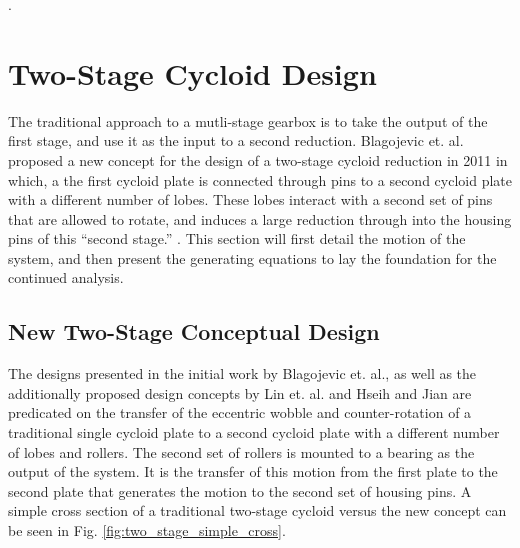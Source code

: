 .

\section{Two-Stage Cycloid Design} \label{ch:dual:initial_equations}

The traditional approach to a mutli-stage gearbox is to take the output of the first stage, and use it as the input to a second reduction. Blagojevic et. al. proposed a new concept for the design of a two-stage cycloid reduction in 2011 in which, a the first cycloid plate is connected through pins to a second cycloid plate with a different number of lobes. These lobes interact with a second set of pins that are allowed to rotate, and induces a large reduction through into the housing pins of this ``second stage.'' \cite{ref:new_two_stage}. This section will first detail the motion of the system, and then present the generating equations to lay the foundation for the continued analysis. 

\subsection{New Two-Stage Conceptual Design} \label{ch:dual:initial_equation:motion}

The designs presented in the initial work by Blagojevic et. al., as well as the additionally proposed design concepts by Lin et. al. \cite{ref:two_stage_tooth_mod} and Hseih and Jian \cite{ref:hsieh_effect_2016} are predicated on the transfer of the eccentric wobble and counter-rotation of a traditional single cycloid plate to a second cycloid plate with a different number of lobes and rollers. The second set of rollers is mounted to a bearing as the output of the system. It is the transfer of this motion from the first plate to the second plate that generates the motion to the second set of housing pins. A simple cross section of a traditional two-stage cycloid versus the new concept can be seen in Fig. \ref{fig:two_stage_simple_cross}. 

